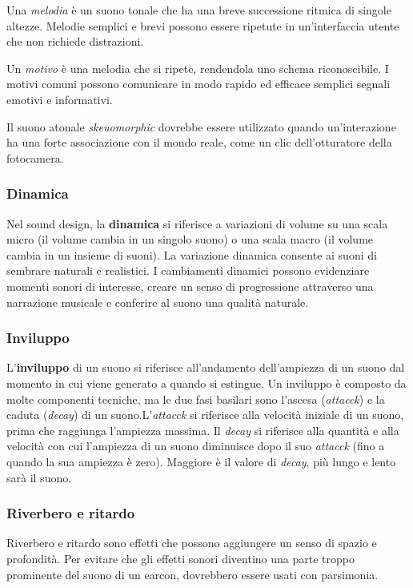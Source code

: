 \documentclass[12pt, a4paper]{report}
\begin{document}
                    Una \textit{melodia} è un suono tonale che ha una breve successione ritmica di singole altezze. Melodie semplici e brevi possono essere ripetute in un'interfaccia utente che non richiede distrazioni.

                    Un \textit{motivo} è una melodia che si ripete, rendendola uno schema riconoscibile. I motivi comuni possono comunicare in modo rapido ed efficace semplici segnali emotivi e informativi.

                    Il suono atonale \textit{skeuomorphic} dovrebbe essere utilizzato quando un'interazione ha una forte associazione con il mondo reale, come un clic dell'otturatore della fotocamera.


                    \subsubsection{Dinamica}
                    Nel sound design, la \textbf{dinamica} si riferisce a variazioni di volume su una scala micro (il volume cambia in un singolo suono) o una scala macro (il volume cambia in un insieme
                    di suoni). La variazione dinamica consente ai suoni di sembrare naturali e realistici. I cambiamenti dinamici possono evidenziare momenti sonori di interesse, creare un senso
                    di progressione attraverso una narrazione musicale e conferire al suono una qualità naturale.


                    \subsubsection{Inviluppo}
                    L'\textbf{inviluppo} di un suono si riferisce all'andamento dell'ampiezza di un suono dal momento in cui viene generato a quando si estingue. Un inviluppo è composto da molte componenti
                    tecniche, ma le due fasi basilari sono l'ascesa (\textit{attacck}) 	e la caduta (\textit{decay}) di un suono.L'\textit{attacck} si riferisce alla velocità iniziale di un suono, prima che
                    raggiunga l'ampiezza massima. Il \textit{decay} si riferisce alla quantità e alla velocità 	con cui l'ampiezza di un suono diminuisce dopo il suo \textit{attacck} (fino a quando la sua
                    ampiezza è zero). Maggiore è il valore di \textit{decay}, più lungo e lento sarà il suono.


                    \subsubsection{Riverbero e ritardo}
                    	Riverbero e ritardo sono effetti che possono aggiungere un senso di spazio e profondità. Per evitare che gli effetti sonori diventino una parte troppo prominente del suono di un earcon, dovrebbero essere usati con parsimonia.
\end{document}
